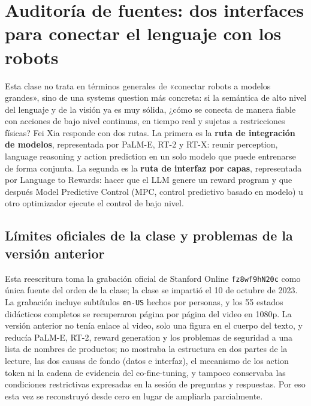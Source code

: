 \documentclass[a4paper]{article}
\begin{document}
\makecscover

\section{Auditoría de fuentes: dos interfaces para conectar el lenguaje con los robots}

Esta clase no trata en términos generales de «conectar robots a modelos grandes», sino de una systems question más concreta: si la semántica de alto nivel del lenguaje y de la visión ya es muy sólida, ¿cómo se conecta de manera fiable con acciones de bajo nivel continuas, en tiempo real y sujetas a restricciones físicas? Fei Xia responde con dos rutas. La primera es la \textbf{ruta de integración de modelos}, representada por PaLM-E, RT-2 y RT-X: reunir perception, language reasoning y action prediction en un solo modelo que puede entrenarse de forma conjunta. La segunda es la \textbf{ruta de interfaz por capas}, representada por Language to Rewards: hacer que el LLM genere un reward program y que después Model Predictive Control (MPC, control predictivo basado en modelo) u otro optimizador ejecute el control de bajo nivel.

\subsection{Límites oficiales de la clase y problemas de la versión anterior}

Esta reescritura toma la grabación oficial de Stanford Online \texttt{fz8wf9hN20c} como única fuente del orden de la clase; la clase se impartió el 10 de octubre de 2023. La grabación incluye subtítulos \texttt{en-US} hechos por personas, y los 55 estados didácticos completos se recuperaron página por página del video en 1080p. La versión anterior no tenía enlace al video, solo una figura en el cuerpo del texto, y reducía PaLM-E, RT-2, reward generation y los problemas de seguridad a una lista de nombres de productos; no mostraba la estructura en dos partes de la lecture, las dos causas de fondo (datos e interfaz), el mecanismo de los action token ni la cadena de evidencia del co-fine-tuning, y tampoco conservaba las condiciones restrictivas expresadas en la sesión de preguntas y respuestas. Por eso esta vez se reconstruyó desde cero en lugar de ampliarla parcialmente.
\end{document}
